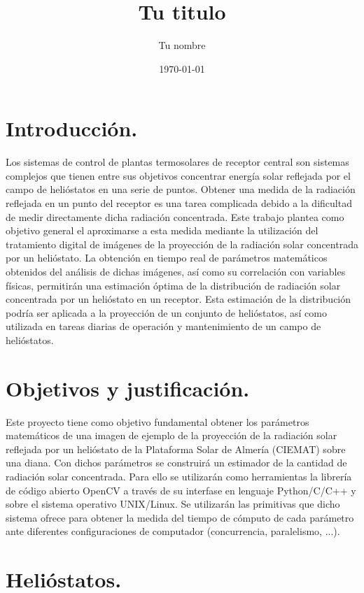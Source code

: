 \documentclass[12pt]{article}
\title{Tu titulo}					%
\author{Tu nombre}					%
\date{\today}						%
\begin{document}
\tableofcontents
\pagebreak


\section{Introducción.}

Los sistemas de control de plantas termosolares de receptor central son sistemas complejos que tienen entre sus objetivos concentrar energía solar reflejada por el campo de helióstatos en una serie de puntos. Obtener una medida de la radiación reflejada en un punto del receptor es una tarea complicada debido a la dificultad de medir directamente dicha radiación concentrada. Este trabajo plantea como objetivo general el aproximarse a esta medida mediante la utilización del tratamiento digital de imágenes de la proyección de la radiación solar concentrada por un helióstato.
La obtención en tiempo real de parámetros matemáticos obtenidos del análisis de dichas imágenes, así como su correlación con variables físicas, permitirán una estimación óptima de la distribución de radiación solar concentrada por un helióstato en un receptor. Esta estimación de la distribución podría ser aplicada a la proyección de un conjunto de helióstatos, así como utilizada en tareas diarias de operación y mantenimiento de un campo de helióstatos.

\section{Objetivos y justificación.}

Este proyecto tiene como objetivo fundamental obtener los parámetros matemáticos de una imagen de ejemplo de la proyección de la radiación solar reflejada por un helióstato de la Plataforma Solar de Almería (CIEMAT) sobre una diana. Con dichos parámetros se construirá un estimador de la cantidad de radiación solar concentrada.
Para ello se utilizarán como herramientas la librería de código abierto OpenCV a través de su interfase en lenguaje Python/C/C++ y sobre el sistema operativo UNIX/Linux. Se utilizarán las primitivas que dicho sistema ofrece para obtener la medida del tiempo de cómputo de cada parámetro ante diferentes configuraciones de computador (concurrencia, paralelismo, ...). \cite{OpenCVWebPage} \cite{SALWebPage} \cite{IEEEXploreWebPage}

\section{Helióstatos.}
\end{document}
